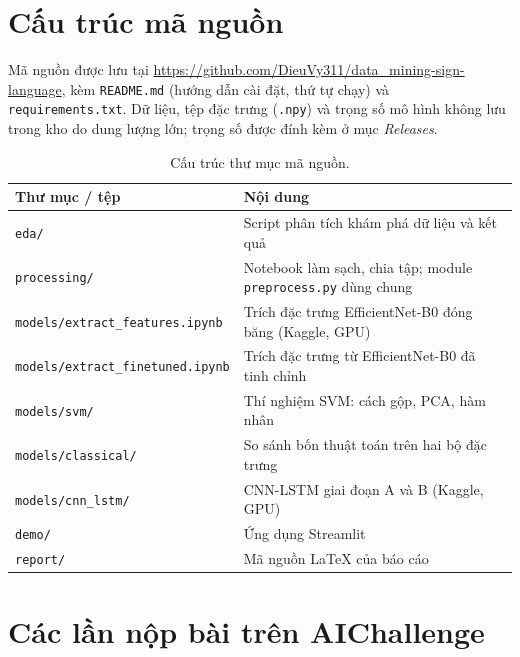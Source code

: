 \section{Cấu trúc mã nguồn}
\label{app:repo}

Mã nguồn được lưu tại \url{https://github.com/DieuVy311/data_mining-sign-language}, kèm \texttt{README.md} (hướng dẫn cài đặt, thứ tự chạy) và \texttt{requirements.txt}.
Dữ liệu, tệp đặc trưng (\texttt{.npy}) và trọng số mô hình không lưu trong kho do dung lượng lớn; trọng số được đính kèm ở mục \textit{Releases}.

\begin{table}[H]
  \centering
  \caption{Cấu trúc thư mục mã nguồn.}
  \label{tab:repo}
  \small
  \begin{tabular}{@{}p{}p{}@{}}
    \toprule
    \textbf{Thư mục / tệp} & \textbf{Nội dung} \\
    \midrule
    \texttt{eda/} & Script phân tích khám phá dữ liệu và kết quả \\
    \texttt{processing/} & Notebook làm sạch, chia tập; module \texttt{preprocess.py} dùng chung \\
    \texttt{models/extract\_features.ipynb} & Trích đặc trưng EfficientNet-B0 đóng băng (Kaggle, GPU) \\
    \texttt{models/extract\_finetuned.ipynb} & Trích đặc trưng từ EfficientNet-B0 đã tinh chỉnh \\
    \texttt{models/svm/} & Thí nghiệm SVM: cách gộp, PCA, hàm nhân \\
    \texttt{models/classical/} & So sánh bốn thuật toán trên hai bộ đặc trưng \\
    \texttt{models/cnn\_lstm/} & CNN-LSTM giai đoạn A và B (Kaggle, GPU) \\
    \texttt{demo/} & Ứng dụng Streamlit \\
    \texttt{report/} & Mã nguồn LaTeX của báo cáo \\
    \bottomrule
  \end{tabular}
\end{table}

\section{Các lần nộp bài trên AIChallenge}
\label{app:submissions}


